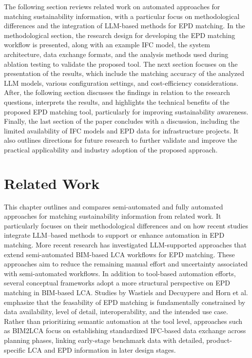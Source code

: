 \documentclass[10pt, a4paper, twocolumn]{article}
\begin{document}
The following section reviews related work on automated approaches for matching sustainability information, with a particular focus on methodological differences and the integration of LLM-based methods for EPD matching. In the methodological section, the research design for developing the EPD matching workflow is presented, along with an example IFC model, the system architecture, data exchange formats, and the analysis methods used during ablation testing to validate the proposed tool. The next section focuses on the presentation of the results, which include the matching accuracy of the analyzed LLM models, various configuration settings, and cost-efficiency considerations. After, the following section discusses the findings in relation to the research questions, interprets the results, and highlights the technical benefits of the proposed EPD matching tool, particularly for improving sustainability awareness. Finally, the last section of the paper concludes with a discussion, including the limited availability of IFC models and EPD data for infrastructure projects. It also outlines directions for future research to further validate and improve the practical applicability and industry adoption of the proposed approach.


\section{Related Work}

This chapter outlines and compares semi-automated and fully automated approaches for matching sustainability information from related work. It particularly focuses on their methodological differences and on how recent studies integrate LLM–based methods to support or enhance automation in EPD matching. 
More recent research has investigated LLM-supported approaches that extend semi-automated BIM-based LCA workflows for EPD matching. These approaches aim to reduce the remaining manual effort and uncertainty associated with semi-automated workflows.  
In addition to tool-based automation efforts, several conceptual frameworks adopt a more structural perspective on EPD matching in BIM-based LCA. Studies by Wastiels and Decuypere and Horn et al. emphasize that the feasability of EPD matching is fundamentally constrained by data availability, level of detail, interoperability, and the intended use case. Rather than prioritizing semantic automation at the tool level, approaches such as BIM2LCA focus on establishing standardized IFC-based data exchange across planning phases, linking early-stage benchmark data with detailed, product-specific LCA and EPD information in later design stages. ~\cite{Wastiels.2019, Horn.2020} 
\end{document}
